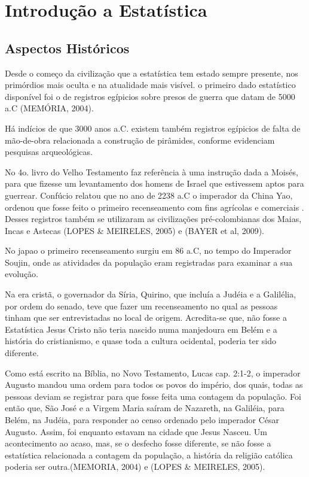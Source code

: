 \chapter{Introdução a Estatística}
\section{Aspectos Históricos}

\inic Desde o começo da civilização que a estatística tem estado
sempre presente, nos primórdios mais oculta e na atualidade mais
visível. o primeiro dado estatístico disponível foi o de registros
egípicios sobre presos de guerra que datam de 5000 a.C (MEMÓRIA, 2004).\vskip0.3cm 

Há indícios de que 3000 anos a.C. existem também registros egípicios
de falta de mão-de-obra relacionada a construção de pirâmides,
conforme evidenciam pesquisas arqueológicas. \vskip0.3cm 

No 4o. livro do Velho
Testamento faz referência à uma instrução dada a Moisés, para que
fizesse um levantamento dos homens de Israel que estivessem aptos
para guerrear. Confúcio relatou que no ano de 2238 a.C o imperador
da China Yao, ordenou que fosse feito o primeiro recenseamento com
fins agrícolas e comerciais . Desses registros também se utilizaram
as civilizações pré-colombianas dos Maias, Incas e
Astecas (LOPES \& MEIRELES, 2005) e (BAYER et al, 2009).\vskip0.3cm


No japao o primeiro recenseamento surgiu em 86 a.C, no tempo do Imperador Soujin, onde as atividades da população eram registradas para examinar a sua evolução.\vskip0.3cm


Na era cristã, o governador da Síria, Quirino, que incluía a Judéia
e a Galilélia, por ordem do senado, teve que fazer um
recenseamento no qual as pessoas tinham que ser entrevistadas no
local de origem. Acredita-se que, não fosse a Estatística Jesus
Cristo não teria nascido numa manjedoura em Belém e a história do
cristianismo, e quase toda a cultura ocidental, poderia ter sido
diferente. \vskip0.3cm


Como está escrito na Bíblia, no Novo Testamento, Lucas
cap. 2:1-2, o imperador Augusto mandou uma ordem para todos os
povos do império, dos quais, todas as pessoas deviam se registrar
para que fosse feita uma contagem da população. Foi então que, São
José e a Virgem Maria saíram de Nazareth, na Galiléia, para Belém,
na Judéia, para responder ao censo ordenado pelo imperador César
Augusto. Assim, foi enquanto estavam na cidade que Jesus
Nasceu. Um acontecimento ao acaso, mas, se o desfecho fosse diferente, se não fosse a estatística relacionada a contagem da população, a história da religião católica poderia ser outra.(MEMORIA, 2004) e (LOPES \& MEIRELES, 2005).\vskip0.3cm



